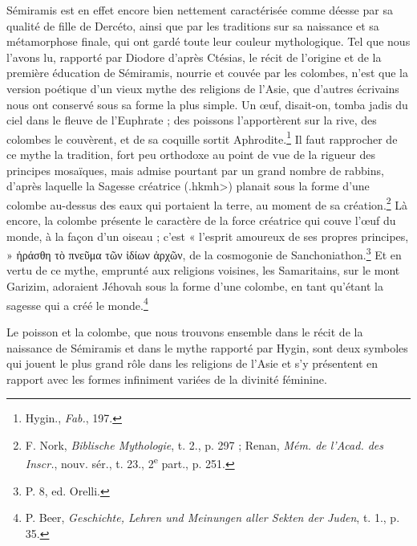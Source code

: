 \documentclass[a4paper, 11pt, oneside]{article}
\begin{document}
Sémiramis est en effet encore bien nettement caractérisée comme déesse par sa qualité de fille de Dercéto, ainsi que par les traditions sur sa naissance et sa métamorphose finale, qui ont gardé toute leur couleur mythologique. Tel que nous l'avons lu, rapporté par Diodore d'après Ctésias, le récit de l'origine et de la première éducation de Sémiramis, nourrie et couvée par les colombes, n'est que la version poétique d'un vieux mythe des religions de l'Asie, que d'autres écrivains nous ont conservé sous sa forme la plus simple. Un œuf, disait-on, tomba jadis du ciel dans le fleuve de l'Euphrate ; des poissons l'apportèrent sur la rive, des colombes le couvèrent, et de sa coquille sortit Aphrodite.\footnote{Hygin., \emph{Fab.}, 197.} Il faut rapprocher de ce mythe la tradition, fort peu orthodoxe au point de vue de la rigueur des principes mosaïques, mais admise pourtant par un grand nombre de rabbins, d'après laquelle la Sagesse créatrice (\<.hkmh>) planait sous la forme d'une colombe au-dessus des eaux qui portaient la terre, au moment de sa création.\footnote{F. Nork, \emph{Biblische Mythologie}, t. 2., p. 297 ; Renan, \emph{Mém. de l'Acad. des Inscr.}, nouv. sér., t. 23., 2\textsuperscript{e} part., p. 251.} Là encore, la colombe présente le caractère de la force créatrice qui couve l'œuf du monde, à la façon d'un oiseau ; c'est « l'esprit amoureux de ses propres principes, » ἡράσθη τὸ πνεῦμα τῶν ἰδίων ἀρχῶν, de la cosmogonie de Sanchoniathon.\footnote{P. 8, ed. Orelli.} Et en vertu de ce mythe, emprunté aux religions voisines, les Samaritains, sur le mont Garizim, adoraient Jéhovah sous la forme d'une colombe, en tant qu'étant la sagesse qui a créé le monde.\footnote{P. Beer, \emph{Geschichte, Lehren und Meinungen aller Sekten der Juden}, t. 1., p. 35.}

Le poisson et la colombe, que nous trouvons ensemble dans le récit de la naissance de Sémiramis et dans le mythe rapporté par Hygin, sont deux symboles qui jouent le plus grand rôle dans les religions de l'Asie et s'y présentent en rapport avec les formes infiniment variées de la divinité féminine.
\end{document}
